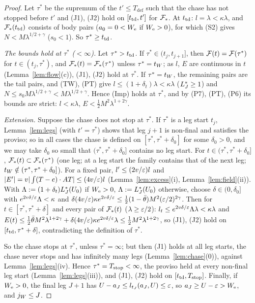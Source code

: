 \begin{proof}
Let $\tau^*$ be the supremum of the $t'\le T_{\mathrm{def}}$ such that the chase has not stopped before $t'$ and (J1), (J2) hold on
$[t_{\mathrm{td}},t']$ for $\mathcal F_*$. At $t_{\mathrm{td}}$: $l=\lambda<\kappa\lambda$, and $\mathcal F_*(t_{\mathrm{td}})$ consists of body pairs ($a_0=0<W_{\mathrm e}$ if $W_{\mathrm e}>0$),
for which (S2) gives $N<M\lambda^{1/2+\gamma}$ ($s_0<1$). So $\tau^*\ge t_{\mathrm{td}}$.

\emph{The bounds hold at $\tau^*$ \textup($<\infty$\textup).} Let $\tau^*>t_{\mathrm{td}}$. If $\tau^*\in(t_j,t_{j+1}]$, then $\mathcal F(t)=\mathcal F(\tau^*)$
for $t\in(t_j,\tau^*)$, and $\mathcal F_*(t)=\mathcal F_*(\tau^*)$ unless $\tau^*=t_W$; as $l$, $E$ are continuous in $t$
(Lemma~\ref{lem:flow}(c)), (J1), (J2) hold at $\tau^*$. If $\tau^*=t_W$, the remaining pairs are the tail pairs, and (TW), (PT) give
$l\le(1+\delta_t)\lambda<\kappa\lambda$ ($L^*_J\ge1$) and $N\le s_0M\lambda^{1/2+\gamma}<M\lambda^{1/2+\gamma}$. Hence (Imp) holds at
$\tau^*$, and by (P7), (PT), (P6) its bounds are strict: $l<\kappa\lambda$, $E<\frac12M^2\lambda^{1+2\gamma}$.

\emph{Extension.} Suppose the chase does not stop at $\tau^*$. If $\tau^*$ is a leg start $t_j$, Lemma~\ref{lem:legs} (with
$t'=\tau^*$) shows that leg $j+1$ is non-final and satisfies the proviso; so in all cases the chase is defined on
$[\tau^*,\tau^*+\delta_0]$ for some $\delta_0>0$, and we may take $\delta_0$ so small that $(\tau^*,\tau^*+\delta_0]$ contains no leg
start. For $t\in(\tau^*,\tau^*+\delta_0]$, $\mathcal F_*(t)\subset\mathcal F_*(\tau^*)$ (one leg; at a leg start the family contains that of the
next leg; $t_W\notin(\tau^*,\tau^*+\delta_0]$). For a fixed pair, $l'\le(2v/\varepsilon)l$ and $|E'|=v|\int(T-e)\cdot AT|\le(4v/\varepsilon)l$
(Lemma~\ref{lem:excess}(i), Lemma~\ref{lem:field}(ii)). With $\Lambda:=(1+\delta_t)L^*_J(U_0)$ if $W_{\mathrm e}>0$, $\Lambda:=L^*_J(U_0)$ otherwise,
choose $\delta\in(0,\delta_0]$ with $e^{2v\delta/\varepsilon}\Lambda<\kappa$ and $\delta(4v/\varepsilon)\kappa e^{2v\delta/\varepsilon}\le\frac12(1-\bar\theta)M^2(\varepsilon/2)^{2\gamma}$.
Then for $t\in[\tau^*,\tau^*+\delta]$ and every pair of $\mathcal F_*(t)$ ($\lambda\ge\varepsilon/2$):
$l_t\le e^{2v\delta/\varepsilon}\Lambda\lambda<\kappa\lambda$ and $E(t)\le\frac12\bar\theta M^2\lambda^{1+2\gamma}+\delta(4v/\varepsilon)\kappa
e^{2v\delta/\varepsilon}\lambda\le\frac12M^2\lambda^{1+2\gamma}$, so \textup{(J1)}, \textup{(J2)} hold on $[t_{\mathrm{td}},\tau^*+\delta]$, contradicting the definition of $\tau^*$.

So the chase stops at $\tau^*$, unless $\tau^*=\infty$; but then (J1) holds at all leg starts, the chase never stops and has
infinitely many legs (Lemma~\ref{lem:chase}(0)), against Lemma~\ref{lem:legs}(iv). Hence $\tau^*=T_{\mathrm{stop}}<\infty$, the proviso held at
every non-final leg start (Lemma~\ref{lem:legs}(iii)), and (J1), (J2) hold on $[t_{\mathrm{td}},T_{\mathrm{stop}}]$. Finally, if $W_{\mathrm e}>0$, the final leg
$J+1$ has $U-a_J\le l_{t_J}(a_J,U)\le\varepsilon$, so $a_J\ge U-\varepsilon>W_{\mathrm e}$, and $j_W\le J$.
\end{proof}
